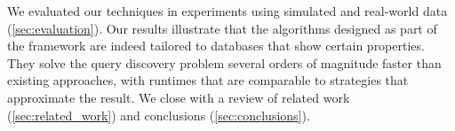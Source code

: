 We evaluated our techniques in experiments using simulated and
real-world data (\autoref{sec:evaluation}). Our results illustrate that the
algorithms designed as part of
the \sys{} framework are indeed tailored to databases that show certain
properties. They solve the query discovery problem
several orders of magnitude faster than existing approaches,
with runtimes that are comparable to
strategies that approximate the result.
We close with a review of related work (\autoref{sec:related_work}) and
conclusions (\autoref{sec:conclusions}).